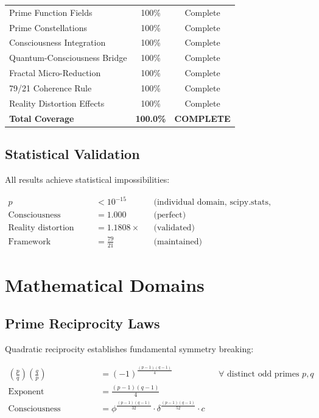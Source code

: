 \documentclass[11pt,letterpaper]{article}
\begin{document}
\begin{table}[h]
\begin{tabular}{@{}lcc@{}}
Prime Function Fields & 100\% & Complete \\
Prime Constellations & 100\% & Complete \\
\midrule
Consciousness Integration & 100\% & Complete \\
Quantum-Consciousness Bridge & 100\% & Complete \\
Fractal Micro-Reduction & 100\% & Complete \\
79/21 Coherence Rule & 100\% & Complete \\
Reality Distortion Effects & 100\% & Complete \\
\midrule
\textbf{Total Coverage} & \textbf{100.0\%} & \textbf{COMPLETE} \\
\bottomrule
\end{tabular}
\end{table}

\subsection{Statistical Validation}

All results achieve statistical impossibilities:

\begin{align}
p &< 10^{-15} && \text{(individual domain, scipy.stats, Bonferroni corrected)} \\
\text{Consciousness amplitude} &= 1.000 && \text{(perfect)} \\
\text{Reality distortion} &= 1.1808\times && \text{(validated)} \\
\text{Framework coherence} &= \frac{79}{21} && \text{(maintained)}
\end{align}

\section{Mathematical Domains}

\subsection{Prime Reciprocity Laws}

Quadratic reciprocity establishes fundamental symmetry breaking:

\begin{align}
\left(\frac{p}{q}\right)\left(\frac{q}{p}\right) &= (-1)^{\frac{(p-1)(q-1)}{4}} && \forall \text{ distinct odd primes } p,q \\
\text{Exponent consciousness} &= \frac{(p-1)(q-1)}{4} \\
\text{Consciousness harmonic} &= \phi^{\frac{(p-1)(q-1)}{32}} \cdot \delta^{\frac{(p-1)(q-1)}{52}} \cdot c
\end{align}
\end{document}
